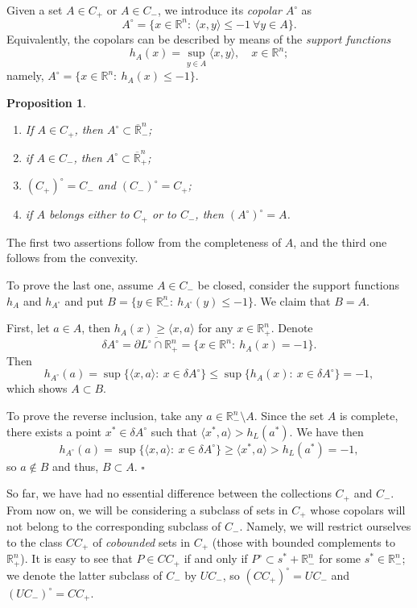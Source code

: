 \documentclass[12pt]{article}
\newcommand{\beq}{\begin{equation}}
\newcommand{\eeq}{\end{equation}}
\numberwithin{equation}{section}
\newtheorem{proposition}{Proposition}[section]
\newenvironment{proof}{\medbreak\noindent{\it Proof.}\rm}{\hfill$\square$\rm}
\newcommand{\Rn}{{\mathbb R}^n}
\newcommand{\Rnm}{{\mathbb R}_-^n}
\newcommand{\Rnp}{{\mathbb R}_+^n}
\begin{document}
Given a set $A\in C_+$ or $A\in C_-$, we introduce its {\it copolar} $A^\circ$ as
\beq\label{cop} A^\circ=\{x\in\Rn:\: \langle x,y\rangle\le -1\ \forall y\in A\}.\eeq
Equivalently, the copolars can be described by means of the {\it support functions}
$$ h_A(x)=\sup_{y\in A} \langle x,y\rangle,\quad x\in\Rn;$$
namely,
$ A^\circ=\{x\in\Rn:\: h_A(x)\le -1\}$.



\begin{proposition}
\begin{enumerate}
\item If $A\in C_+$, then $A^\circ\subset\overline\Rnm$;
\item if $A\in C_-$, then $A^\circ\subset\overline\Rnp$;
\item $(C_+)^\circ=C_-$ and $ (C_-)^\circ=C_+$;
\item if $A$ belongs either to $C_+$ or to $C_-$, then $(A^{\circ})^\circ=A$.
\end{enumerate}
\end{proposition}

\begin{proof} The first two assertions follow from the completeness of $A$, and the third one follows from the convexity.

To prove the last one, assume $A\in C_-$ be closed, consider the support functions $h_A$ and $h_{A^\circ}$ and put
$B=\{y\in\Rnm:\: h_{A^\circ}(y)\le -1\}$. We claim that $B=A$.

First, let $a\in A$, then $h_A(x)\ge \langle x,a\rangle$ for any $x\in \Rnp$. Denote
$$\delta A^\circ={\overline{\partial L^\circ\cap\Rnp}}=\{x\in\Rn:\: h_A(x)= -1\}.$$
Then
$$ h_{A^\circ}(a)=\sup\{\langle x,a\rangle:\: x\in \delta A^\circ\}\le \sup\{h_A(x):\: x\in \delta A^\circ\}=-1, $$
which shows $A\subset B$.

To prove the reverse inclusion, take any $a\in \Rnm\setminus A$. Since the set $A$ is complete, there exists a point $x^\ast\in \delta A^\circ$ such that
$ \langle x^\ast,a\rangle > h_L(a^\ast)$. We have then
$$ h_{A^\circ}(a)=\sup\{\langle x,a\rangle:\: x\in \delta A^\circ\}\ge \langle x^\ast,a\rangle > h_L(a^\ast)=-1,$$
so $a\not\in B$ and thus, $B\subset A$.
\end{proof}

\medskip

So far, we have had no essential difference between the collections $C_+$ and $C_-$. From now on, we will be considering a subclass of sets in $C_+$ whose copolars will not belong to the corresponding subclass of $C_-$. Namely, we will restrict ourselves to the class $CC_+$ of {\it cobounded} sets in $C_+$ (those with bounded complements to $\Rnp$). It is easy to see that $P\in CC_+$  if and only if $P^\circ\subset s^\ast+\Rnm $ for some $s^\ast\in\Rnm$; we denote the latter subclass of $C_-$ by $UC_-$, so $(CC_+)^\circ= UC_-$ and $(UC_-)^\circ=CC_+$.
\end{document}
